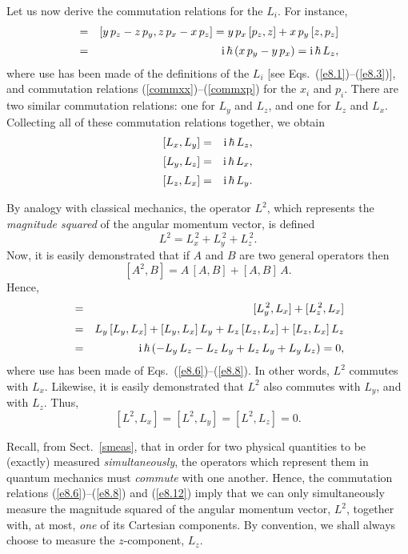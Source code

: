 Let us now derive the commutation relations for the $L_i$. 
For instance,
\begin{eqnarray}
[L_x, L_y]& =& [y\,p_z-z\,p_y, z\,p_x-x\,p_z] = y\,p_x\,[p_z,z] + x\,p_y\,[z,p_z]\nonumber\\[0.5ex] &= &{\rm i}\,\hbar\,(x\,p_y-y\,p_x) = {\rm i}\,\hbar\,L_z,
\end{eqnarray}
where use has been made of the definitions of the $L_i$ [see Eqs.~(\ref{e8.1})--(\ref{e8.3})], and commutation relations (\ref{commxx})--(\ref{commxp})
for the $x_i$ and $p_i$. There are two similar commutation relations:
one for $L_y$ and $L_z$, and one for $L_z$ and $L_x$. Collecting all of these
commutation relations together, we obtain
\begin{eqnarray}\label{e8.6}
[L_x, L_y]&=& {\rm i}\,\hbar\,L_z,\\[0.5ex]
[L_y, L_z]&=& {\rm i}\,\hbar\,L_x,\\[0.5ex]
[L_z,L_x]&=& {\rm i}\,\hbar\,L_y.\label{e8.8}
\end{eqnarray}

By analogy with classical mechanics, the operator $L^2$, which represents
the {\em magnitude squared}\/ of the angular momentum vector,  is defined
\begin{equation}\label{e8.9}
L^2 = L_x^{\,2} + L_y^{\,2} + L_z^{\,2}.
\end{equation}
Now, it is easily demonstrated that if $A$ and $B$ are two general
operators then
\begin{equation}\label{e8.10}
[A^2,B] = A\,[A, B] +[A,B]\,A.
\end{equation}
Hence, 
\begin{eqnarray}
[L^2,L_x] &=& [L_y^{\,2},L_x] + [L_z^{\,2},L_x]\nonumber\\[0.5ex]
&=& L_y\,[L_y,L_x] + [L_y,L_x]\,L_y + L_z\,[L_z,L_x] + [L_z, L_x]\,L_z\nonumber\\[0.5ex]
&=&  {\rm i}\,\hbar\left(-L_y\,L_z - L_z\,L_y + L_z\,L_y + L_y\,L_z\right) = 0,
\end{eqnarray}
where use has been made of Eqs.~(\ref{e8.6})--(\ref{e8.8}). In other words,
$L^2$ commutes with $L_x$. Likewise, it is easily demonstrated that
$L^2$ also commutes with $L_y$, and with $L_z$. Thus,
\begin{equation}\label{e8.12}
[L^2, L_x] = [L^2, L_y] = [L^2,L_z] = 0.
\end{equation}

Recall, from Sect.~\ref{smeas}, that in order for two physical quantities
to be (exactly) measured {\em simultaneously}, the operators which represent
them in quantum mechanics must {\em commute} with one another. Hence, 
 the commutation relations (\ref{e8.6})--(\ref{e8.8}) and (\ref{e8.12})
imply that we can only simultaneously measure the magnitude squared of
the angular momentum vector, $L^2$, together with, at most,  {\em one}\/ of its
Cartesian components. By convention, we shall always choose to measure
the $z$-component, $L_z$. 

